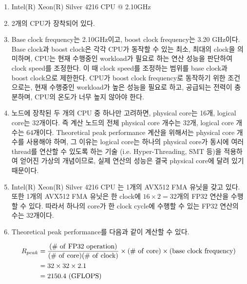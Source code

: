 \begin{enumerate}[label= (\alph*)]

    \item {Intel(R) Xeon(R) Silver 4216 CPU @ 2.10GHz}
    \item {2개의 CPU가 장착되어 있다.}
    \item {
        Base clock frequency는 2.10GHz이고, boost clock frequency는 3.20 GHz이다.
        Base clock과 boost clock은 각각 CPU가 동작할 수 있는 최소, 최대의 clock을 의미하며,
        CPU는 현재 수행중인 workload가 필요로 하는 연산 성능을 판단하여 clock speed를 조정한다.
        이 때 clock speed를 조정하는 범위를 base clock과 boost clock으로 제한한다.
        CPU가 boost clock frequency로 동작하기 위한 조건으로는, 현재 수행중인 workload가 높은 성능을 필요로 하고,
        공급되는 전력이 충분하며, CPU의 온도가 너무 높지 않아야 한다.
    }
    \item {
        노드에 장착된 두 개의 CPU 중 하나만 고려하면, physical core는 16개, logical core는 32개이다.
        즉 계산 노드의 전체 physical core 개수는 32개, logical core 개수는 64개이다.
        Theoretical peak performance 계산을 위해서는 physical core 개수를 사용해야 하며,
        그 이유는 logical core는 하나의 physical core가 동시에 여러 thread를 연산할 수 있도록 하는
        기술 (i.e. Hyper-Threading, SMT 등)을 적용하여 얻어진 가상의 개념이므로,
        실제 연산의 성능은 결국 physical core에 달려 있기 때문이다.
    }
    \item {
        Intel(R) Xeon(R) Silver 4216 CPU 는 1개의 AVX512 FMA 유닛을 갖고 있다\cite{NumAVX512Units}.
        또한 1개의 AVX512 FMA 유닛은 한 clock에 $16\times 2=32$개의 FP32 연산을 수행할 수 있다\cite{FLOPSperUnit, CascadeLakeFLOPS}.
        따라서 하나의 core가 한 clock cycle에 수행할 수 있는 FP32 연산의 수는 32개이다.
    }
    \item {
        Theoretical peak performance를 다음과 같이 계산할 수 있다.
        
        \begin{align}
            R_{peak}
            & =     \mathrm{\frac{(\#~of~FP32~operation)}{(\#~of~core)(\#~of~clock)}}
            \times  \mathrm{(\#~of~core)}
            \times  \mathrm{(base~clock~frequency)} \notag \\
            & = 32 \times 32 \times 2.1 \notag \\
            & = {2150.4}~\mathrm{(GFLOPS)} \notag
        \end{align}
    
    }
    
\end{enumerate}